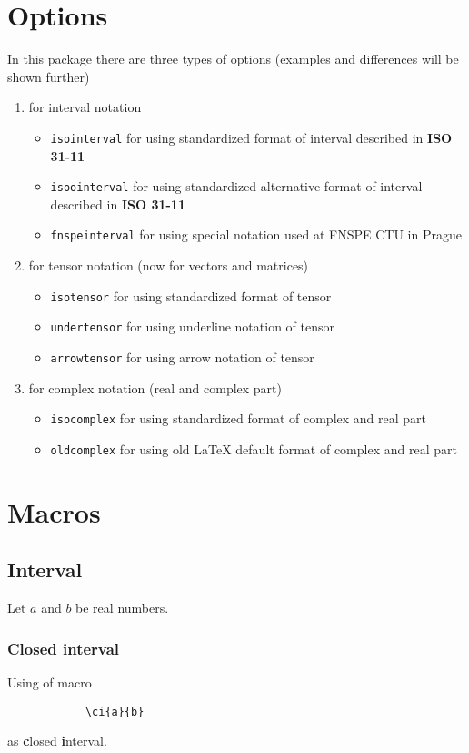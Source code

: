 \documentclass{article}
\begin{document}
	\section*{Options}
	
	In this package there are three types of options (examples and differences will be shown further)
	\begin{enumerate}
		\item for interval notation
			\begin{itemize}
				\item \texttt{isointerval} for using standardized format of interval described in \textbf{ISO 31-11}
				\item \texttt{isoointerval} for using standardized alternative format of interval described in \textbf{ISO 31-11}
				\item \texttt{fnspeinterval} for using special notation used at FNSPE CTU in Prague
			\end{itemize}
		\item for tensor notation (now for vectors and matrices)
			\begin{itemize}
				\item \texttt{isotensor} for using standardized format of tensor 
				\item \texttt{undertensor} for using underline notation of tensor 
				\item \texttt{arrowtensor} for using arrow notation of tensor
			\end{itemize}
		\item for complex notation (real and complex part)
			\begin{itemize}
				\item \texttt{isocomplex} for using standardized format of complex and real part 
				\item \texttt{oldcomplex} for using old \LaTeX{} default format of complex and real part 
			\end{itemize}
	\end{enumerate}

	\section*{Macros}
		\subsection*{Interval}
		Let $a$ and $b$ be real numbers.
		
		\subsubsection*{Closed interval}
		Using of macro
		\begin{lstlisting}
			\ci{a}{b}
		\end{lstlisting}
		as \textbf{c}losed \textbf{i}nterval.
		
\end{document}
